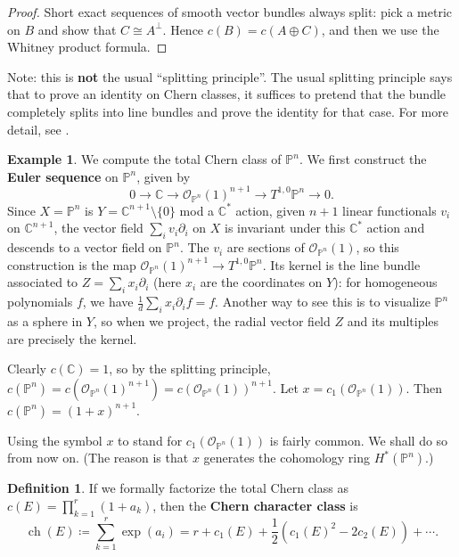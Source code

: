 \documentclass{report}
\theoremstyle{plain}
\theoremstyle{definition}
\newtheorem{definition}[theorem]{Definition}
\newtheorem{example}[theorem]{Example}
\theoremstyle{remark}
\newcommand{\di}{\partial}
\newcommand{\bC}{\mathbb{C}}
\newcommand{\bP}{\mathbb{P}}
\newcommand{\cO}{\mathcal{O}}
\DeclareMathOperator{\ch}{ch}
\begin{document}
\begin{proof}
  Short exact sequences of smooth vector bundles always split: pick a
  metric on $B$ and show that $C \cong A^\perp$. Hence $c(B) = c(A
  \oplus C)$, and then we use the Whitney product formula.
\end{proof}

Note: this is {\bf not} the usual ``splitting principle''. The usual
splitting principle says that to prove an identity on Chern classes,
it suffices to pretend that the bundle completely splits into line
bundles and prove the identity for that case. For more detail, see
\cite[Section 21]{Bott1982}.

\begin{example} \label{ex:chern-proj}
  We compute the total Chern class of $\bP^n$. We first construct the
  {\bf Euler sequence} on $\bP^n$, given by
  \[ 0 \to \bC \to \cO_{\bP^n}(1)^{n+1} \to T^{1,0}\bP^n \to 0. \]
  Since $X = \bP^n$ is $Y = \bC^{n+1} \setminus \{0\}$ mod a $\bC^*$
  action, given $n+1$ linear functionals $v_i$ on $\bC^{n+1}$, the
  vector field $\sum_i v_i \di_i$ on $X$ is invariant under this
  $\bC^*$ action and descends to a vector field on $\bP^n$. The $v_i$
  are sections of $\cO_{\bP^n}(1)$, so this construction is the map
  $\cO_{\bP^n}(1)^{n+1} \to T^{1,0}\bP^n$. Its kernel is the line
  bundle associated to $Z = \sum_i x_i \di_i$ (here $x_i$ are the
  coordinates on $Y$): for homogeneous polynomials $f$, we have
  $\frac{1}{d} \sum_i x_i \di_i f = f$. Another way to see this is to
  visualize $\bP^n$ as a sphere in $Y$, so when we project, the radial
  vector field $Z$ and its multiples are precisely the kernel.

  Clearly $c(\bC) = 1$, so by the splitting principle, $c(\bP^n) =
  c(\cO_{\bP^n}(1)^{n+1}) = c(\cO_{\bP^n}(1))^{n+1}$. Let $x =
  c_1(\cO_{\bP^n}(1))$. Then $c(\bP^n) = (1 + x)^{n+1}$.
\end{example}

Using the symbol $x$ to stand for $c_1(\cO_{\bP^n}(1))$ is fairly
common. We shall do so from now on. (The reason is that $x$ generates
the cohomology ring $H^*(\bP^n)$.)

\begin{definition}
  If we formally factorize the total Chern class as $c(E) =
  \prod_{k=1}^r (1 + a_k)$, then the {\bf Chern character class} is
  \[ \ch(E) \coloneqq \sum_{k=1}^r \exp(a_i) = r + c_1(E) + \frac{1}{2}(c_1(E)^2 - 2c_2(E)) + \cdots. \]
\end{definition}
\end{document}

